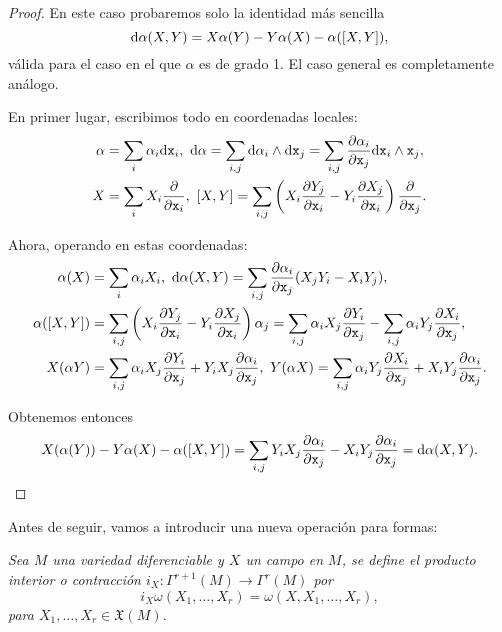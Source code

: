 \begin{proof}
En este caso probaremos solo la identidad más sencilla 
\begin{equation*}
  \mathrm{d} \alpha (X,Y) = X\alpha(Y) - Y \alpha(X) - \alpha(\left[X,Y\right]),
\end{equation*}
válida para el caso en el que $\alpha$ es de grado 1. El caso general es completamente análogo.

En primer lugar, escribimos todo en coordenadas locales:
\begin{align*}
  \alpha &= \sum_i \alpha_i \dd \xx _i, \ \dd \alpha = \sum_{i,j} \dd \alpha_i \wedge \dd \xx _j = \sum_{i,j}\parcial{\alpha_i}{\xx_j} \dd \xx_i \wedge \xx_j, \\
  X &= \sum_i X_i \deriv{\xx_i}, \ 
  \lie{X}{Y} = \sum_{i,j} \left( X_i \parcial{Y_j}{\xx_i} - Y_i \parcial{X_j}{\xx_i} \right) \deriv{\xx_j}.
\end{align*}

Ahora, operando en estas coordenadas:
\begin{align*}
  \alpha(X) &= \sum_i \alpha_i X_i, \ 
  \dd \alpha (X,Y) = \sum_{i,j} \parcial{\alpha_i}{\xx_j} (X_jY_i-X_iY_j), \\
  \alpha(\lie{X}{Y}) &= \sum_{i,j} \left( X_i \parcial{Y_j}{\xx_i} - Y_i \parcial{X_j}{\xx_i} \right) \alpha_j = \sum_{i,j} \alpha_i X_j \parcial{Y_i}{\xx_j} - \sum_{i,j}\alpha_i Y_j \parcial{X_i}{\xx_j}, \\
  X(\alpha Y) &= \sum_{i,j}\alpha_i X_j \parcial{Y_i}{\xx_j} + Y_i X_j \parcial{\alpha_i}{\xx_j}, \ 
Y(\alpha X) = \sum_{i,j}\alpha_i Y_j \parcial{X_i}{\xx_j} + X_i Y_j \parcial{\alpha_i}{\xx_j}.
\end{align*}

Obtenemos entonces
\begin{equation*}
  X(\alpha(Y))-Y\alpha(X)-\alpha(\left[X,Y\right]) = \sum_{i,j} Y_iX_j \frac{\partial \alpha_i}{\partial \mathtt{x}_j} - X_iY_j \frac{\partial \alpha_i}{\partial \mathtt{x}_j} = \mathrm{d} \alpha (X,Y).
\end{equation*}
\end{proof}

Antes de seguir, vamos a introducir una nueva operación para formas:
\begin{defn}
  \em
  Sea $M$ una variedad diferenciable y $X$ un campo en $M$, se define el \emph{producto interior} o \emph{contracción} $i_X:\Gamma^{r+1}(M)\rightarrow \Gamma^r(M)$ por 
  \begin{equation*}
    i_X \omega(X_1,\dots,X_r)=\omega(X,X_1,\dots,X_r),
  \end{equation*}
  para $X_1,\dots,X_r \in \mathfrak{X}(M)$.
\end{defn}

